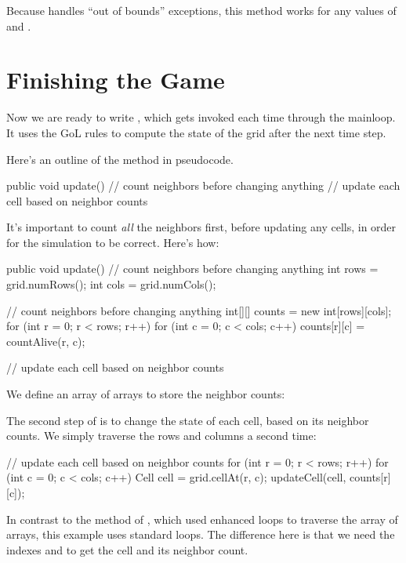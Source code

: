 Because  handles ``out of bounds'' exceptions, this method works for any values of  and .


\section{Finishing the Game}
\label{sec:update}

Now we are ready to write , which gets invoked each time through the mainloop.
It uses the GoL rules to compute the state of the grid after the next time step.

Here's an outline of the method in pseudocode.

\begin{code}
public void update() {
    // count neighbors before changing anything
    // update each cell based on neighbor counts
}
\end{code}

It's important to count {\em all} the neighbors first, before updating any cells, in order for the simulation to be correct.
Here's how:


\begin{code}
public void update() {
    // count neighbors before changing anything
}
    int rows = grid.numRows();
    int cols = grid.numCols();

    // count neighbors before changing anything
	int[][] counts = new int[rows][cols];
	for (int r = 0; r < rows; r++) {
        for (int c = 0; c < cols; c++) {
            counts[r][c] = countAlive(r, c);
        }
    }
    
    // update each cell based on neighbor counts

\end{code}

We define an array of arrays to store the neighbor counts:


The second step of  is to change the state of each cell, based on its neighbor counts.
We simply traverse the rows and columns a second time:

\begin{code}
// update each cell based on neighbor counts
for (int r = 0; r < rows; r++) {
    for (int c = 0; c < cols; c++) {
        Cell cell = grid.cellAt(r, c);
        updateCell(cell, counts[r][c]);
    }
}
\end{code}

In contrast to the  method of , which used enhanced  loops to traverse the array of arrays, this example uses standard  loops.
The difference here is that we need the indexes  and  to get the cell and its neighbor count.

